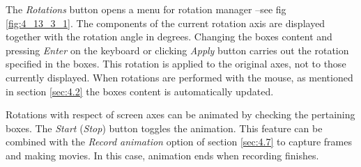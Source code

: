 \documentclass[10pt]{article}
\begin{document}
The {\it Rotations} button opens a menu for rotation manager --see fig
\ref{fig:4_13_3_1}. The components of the current rotation axis are displayed together
with the rotation angle in degrees. Changing the boxes content and pressing {\it Enter} on the keyboard or clicking
{\it Apply} button carries out the rotation specified in the boxes.
This rotation is applied to the original axes, not to those currently displayed.
When rotations are performed with the mouse, as mentioned in section \ref{sec:4.2}
the boxes content is automatically updated.

Rotations with respect of screen axes can be animated
by checking the pertaining
boxes. The {\it Start} ({\it Stop}) button toggles the animation. This feature can be 
combined with the {\it Record animation} 
option of section \ref{sec:4.7} to capture
frames and making movies. In this case, animation ends when recording finishes.
\end{document}
